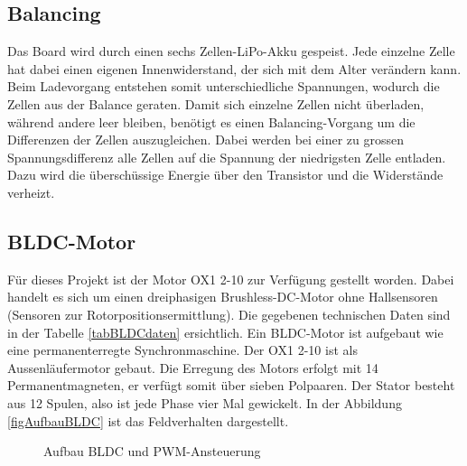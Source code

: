 \subsection{Balancing}
\label{tGl_Balancing}
Das Board wird durch einen sechs Zellen-LiPo-Akku gespeist. Jede einzelne Zelle hat dabei einen eigenen Innenwiderstand, der sich mit dem Alter verändern kann. Beim Ladevorgang entstehen somit unterschiedliche Spannungen, wodurch die Zellen aus der Balance geraten.
Damit sich einzelne Zellen nicht überladen, während andere leer bleiben, benötigt es einen Balancing-Vorgang um die Differenzen der Zellen auszugleichen. 
Dabei werden bei einer zu grossen Spannungsdifferenz alle Zellen auf die Spannung der niedrigsten Zelle entladen.
Dazu wird die überschüssige Energie über den Transistor und die Widerstände verheizt.

\subsection{BLDC-Motor}
\label{tGl_BLDC}
Für dieses Projekt ist der Motor OX1 2-10 zur Verfügung gestellt worden. Dabei handelt es sich um einen dreiphasigen Brushless-DC-Motor ohne Hallsensoren (Sensoren zur Rotorpositionsermittlung). Die gegebenen technischen Daten sind in der Tabelle \ref{tabBLDCdaten} ersichtlich.
Ein BLDC-Motor ist aufgebaut wie eine permanenterregte Synchronmaschine. Der OX1 2-10 ist als Aussenläufermotor gebaut.
Die Erregung des Motors erfolgt mit 14 Permanentmagneten, er verfügt somit über sieben Polpaaren. Der Stator besteht aus 12 Spulen, also ist jede Phase vier Mal gewickelt. 
In der Abbildung \ref{figAufbauBLDC} ist das Feldverhalten dargestellt.\\

\begin{figure} [H]
{}
\caption[BLDC Motor]{Aufbau BLDC und PWM-Ansteuerung}
\label{fig:BLDC}
\end{figure}

